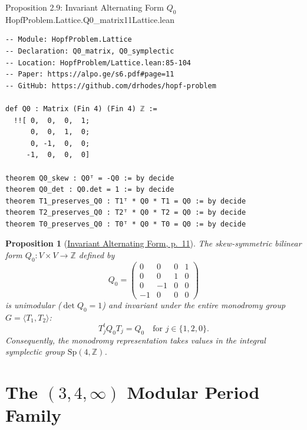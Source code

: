 \documentclass[10pt]{article}
\newtheorem{proposition}[theorem]{Proposition}
\newcommand{\dbZ}{\mathbb{Z}}
\newcommand{\Sp}{\mathrm{Sp}}
\gdef\hashchar{#}
\newcommand{\paperref}[2]{\href{https://alpo.ge/s6.pdf\hashchar page=#1}{#2}}
\begin{document}
\begin{comparativeblock}{Proposition 2.9: Invariant Alternating Form $Q_0$}{HopfProblem.Lattice.Q0_matrix}{11}{Lattice.lean}
\begin{verbatim}
-- Module: HopfProblem.Lattice
-- Declaration: Q0_matrix, Q0_symplectic
-- Location: HopfProblem/Lattice.lean:85-104
-- Paper: https://alpo.ge/s6.pdf#page=11
-- GitHub: https://github.com/drhodes/hopf-problem

def Q0 : Matrix (Fin 4) (Fin 4) ℤ :=
  !![ 0,  0,  0,  1;
      0,  0,  1,  0;
      0, -1,  0,  0;
     -1,  0,  0,  0]

theorem Q0_skew : Q0ᵀ = -Q0 := by decide
theorem Q0_det : Q0.det = 1 := by decide
theorem T1_preserves_Q0 : T1ᵀ * Q0 * T1 = Q0 := by decide
theorem T2_preserves_Q0 : T2ᵀ * Q0 * T2 = Q0 := by decide
theorem T0_preserves_Q0 : T0ᵀ * Q0 * T0 = Q0 := by decide
\end{verbatim}
\tcblower
\begin{proposition}[\paperref{11}{Invariant Alternating Form, p.~11}]\label{prop:Q0-form}
The skew-symmetric bilinear form $Q_0\colon V \times V \to \dbZ$ defined by
\[
Q_0 = \begin{pmatrix} 0 & 0 & 0 & 1 \\ 0 & 0 & 1 & 0 \\ 0 & -1 & 0 & 0 \\ -1 & 0 & 0 & 0 \end{pmatrix}
\]
is unimodular ($\det Q_0 = 1$) and invariant under the entire monodromy group $G = \langle T_1, T_2 \rangle$:
\[
T_j^t Q_0 T_j = Q_0 \quad \text{for } j \in \{1, 2, 0\}.
\]
Consequently, the monodromy representation takes values in the integral symplectic group $\Sp(4, \dbZ)$.
\end{proposition}
\end{comparativeblock}

\newpage

\section{The \texorpdfstring{$(3,4,\infty)$}{(3,4,infty)} Modular Period Family}
\end{document}
